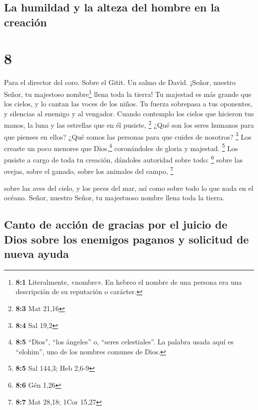 \hypertarget{la-humildad-y-la-alteza-del-hombre-en-la-creaciuxf3n}{%
\subsection{La humildad y la alteza del hombre en la
creación}\label{la-humildad-y-la-alteza-del-hombre-en-la-creaciuxf3n}}

\hypertarget{section-7}{%
\section{8}\label{section-7}}

Para el director del coro. Sobre el Gitit. Un salmo de David.
 ¡Señor, nuestro Señor, tu majestoso nombre\footnote{\textbf{8:1}
  Literalmente, «nombre». En hebreo el nombre de una persona era una
  descripción de su reputación o carácter.} llena toda la tierra! Tu
majestad es más grande que los cielos,  y lo cantan las
voces de los niños. Tu fuerza sobrepasa a tus oponentes, y silencias al
enemigo y al vengador.  Cuando contemplo los cielos que
hicieron tus manos, la luna y las estrellas que en él pusiste,
\footnote{\textbf{8:3} Mat 21,16}  ¿Qué son los seres
humanos para que pienses en ellos? ¿Qué somos las personas para que
cuides de nosotros? \footnote{\textbf{8:4} Sal 19,2}  Los
creaste un poco menores que Dios,\footnote{\textbf{8:5} ``Dios'', ``los
  ángeles'' o, ``seres celestiales''. La palabra usada aquí es
  ``elohim'', uno de los nombres comunes de Dios.} coronándoles de
gloria y majestad. \footnote{\textbf{8:5} Sal 144,3; Heb 2,6-9}
 Los pusiste a cargo de toda tu creación, dándoles
autoridad sobre todo: \footnote{\textbf{8:6} Gén 1,26} 
sobre las ovejas, sobre el ganado, sobre los animales del campo,
\footnote{\textbf{8:7} Mat 28,18; 1Cor 15,27}

 sobre las aves del cielo, y los peces del mar, así como
sobre todo lo que nada en el océano.  Señor, nuestro
Señor, tu majestuoso nombre llena toda la tierra.

\hypertarget{canto-de-acciuxf3n-de-gracias-por-el-juicio-de-dios-sobre-los-enemigos-paganos-y-solicitud-de-nueva-ayuda}{%
\subsection{Canto de acción de gracias por el juicio de Dios sobre los
enemigos paganos y solicitud de nueva
ayuda}\label{canto-de-acciuxf3n-de-gracias-por-el-juicio-de-dios-sobre-los-enemigos-paganos-y-solicitud-de-nueva-ayuda}}

